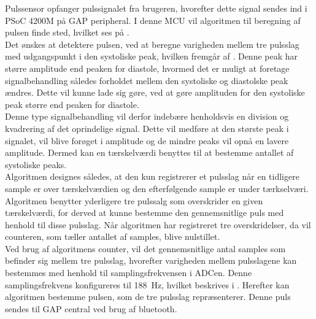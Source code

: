 Pulssensor opfanger pulssignalet fra brugeren, hvorefter dette signal sendes ind i PSoC 4200M på GAP peripheral. I denne MCU vil algoritmen til beregning af pulsen finde sted, hvilket ses på . \\
Det ønskes at detektere pulsen, ved at beregne varigheden mellem tre pulsslag med udgangspunkt i den systoliske peak, hvilken fremgår af . Denne peak har større amplitude end peaken for diastole, hvormed det er muligt at foretage signalbehandling således forholdet mellem den systoliske og diastolske peak ændres. Dette vil kunne lade sig gøre, ved at gøre amplituden for den systoliske peak større end peaken for diastole. \\
Denne type signalbehandling vil derfor indebære henholdsvis en division og kvadrering af det oprindelige signal. Dette vil medføre at den største peak i signalet, vil blive forøget i amplitude og de mindre peaks vil opnå en lavere amplitude. Dermed kan en tærskelværdi benyttes til at bestemme antallet af systoliske peaks. \\
Algoritmen designes således, at den kun registrerer et pulsslag når en tidligere sample er over tærskelværdien og den efterfølgende sample er under tærkselværi. Algoritmen benytter yderligere tre pulssalg som overskrider en given tærskelværdi, for derved at kunne bestemme den gennemsnitlige puls med henhold til disse pulsslag. Når algoritmen har registreret tre overskridelser, da vil counteren, som tæller antallet af samples, blive nulstillet. \\
Ved brug af algoritmens counter, vil det gennemsnitlige antal samples som befinder sig mellem tre pulsslag, hvorefter varigheden mellem pulsslagene kan bestemmes med henhold til samplingsfrekvensen i ADCen. Denne samplingsfrekvens konfigureres til 188~Hz, hvilket beskrives i . Herefter kan algoritmen bestemme pulsen, som de tre pulsslag repræsenterer. Denne puls sendes til GAP central ved brug af bluetooth. 


